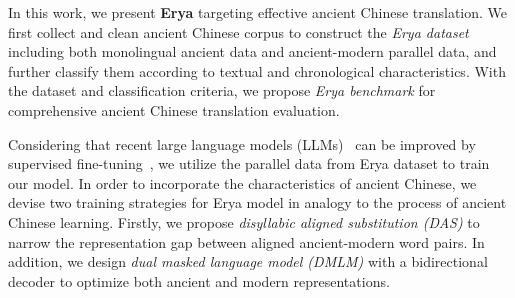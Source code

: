 In this work, we present \textbf{Erya} targeting effective ancient Chinese translation.
We first collect and clean ancient Chinese corpus to construct the \textit{Erya dataset} including both monolingual ancient data and ancient-modern parallel data, and further classify them according to textual and chronological characteristics. With the dataset and classification criteria, we propose \textit{Erya benchmark} for comprehensive ancient Chinese translation evaluation.


Considering that recent large language models (LLMs)~\cite{llm_survey} can be improved by supervised fine-tuning~\cite{DBLP:conf/nips/Ouyang0JAWMZASR22}, we utilize the parallel data from Erya dataset to train our model. 
In order to incorporate the characteristics of ancient Chinese, 
we devise two training strategies for Erya model in analogy to the process of ancient Chinese learning. 
Firstly, we propose \textit{disyllabic aligned substitution (DAS)} to narrow the representation gap between aligned ancient-modern word pairs.
In addition, we design \textit{dual masked language model (DMLM)} with a bidirectional decoder to optimize both ancient and modern representations. 









